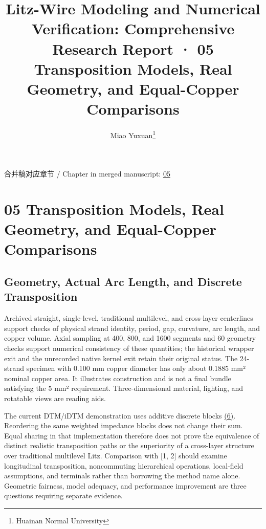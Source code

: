 \documentclass[journal,10pt]{IEEEtran}
\begin{document}
\title{Litz-Wire Modeling and Numerical Verification: Comprehensive Research Report · 05 Transposition Models, Real Geometry, and Equal-Copper Comparisons}
\author{Miao Yuxuan\thanks{Huainan Normal University}}

\maketitle
\noindent 合并稿对应章节 / Chapter in merged manuscript: \href{report_en_ieee.pdf#chapter-05}{05}\par
\FloatBarrier
\section*{05 Transposition Models, Real Geometry, and Equal-Copper Comparisons}
\hypertarget{chapter-05}{}
\subsection*{Geometry, Actual Arc Length, and Discrete Transposition}
\hypertarget{05.geometry.heading}{}
Archived straight, single-level, traditional multilevel, and cross-layer centerlines support checks of physical strand identity, period, gap, curvature, arc length, and copper volume. Axial sampling at 400, 800, and 1600 segments and 60 geometry checks support numerical consistency of these quantities; the historical wrapper exit and the unrecorded native kernel exit retain their original status. The 24-strand specimen with 0.100 mm copper diameter has only about 0.1885 mm² nominal copper area. It illustrates construction and is not a final bundle satisfying the 5 mm² requirement. Three-dimensional material, lighting, and rotatable views are reading aids.


The current DTM/iDTM demonstration uses additive discrete blocks \href{report_en_ieee.pdf#E06}{(6)}. Reordering the same weighted impedance blocks does not change their sum. Equal sharing in that implementation therefore does not prove the equivalence of distinct realistic transposition paths or the superiority of a cross-layer structure over traditional multilevel Litz. Comparison with [1, 2] should examine longitudinal transposition, noncommuting hierarchical operations, local-field assumptions, and terminals rather than borrowing the method name alone. Geometric fairness, model adequacy, and performance improvement are three questions requiring separate evidence.
\end{document}
